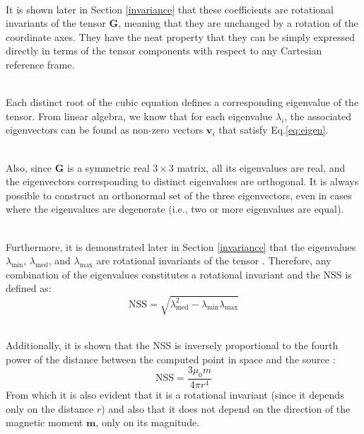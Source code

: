 \documentclass[main]{subfiles}
\begin{document}
\noindent\\
It is shown later in Section \ref{invariance} that these coefficients are rotational invariants of 
the tensor \( \mathbf{G} \), meaning that they are unchanged by a 
rotation of the coordinate axes. They have the neat property that they can be simply expressed
directly in terms of the tensor components with respect to any
Cartesian reference frame.

\noindent\\
Each distinct root of the cubic equation defines a corresponding 
eigenvalue of the tensor. From linear algebra, we know that for each eigenvalue \( \lambda_i \), the 
associated eigenvectors can be found as non-zero vectors 
\( \mathbf{v}_i \) that satisfy Eq.\ref{eq:eigen}.

\noindent\\
Also, since \( \mathbf{G} \) is a symmetric real \( 3 \times 3 \) matrix, 
all its eigenvalues are real, and the eigenvectors corresponding to 
distinct eigenvalues are orthogonal. It is always possible to construct 
an orthonormal set of the three eigenvectors, even in cases where the 
eigenvalues are degenerate (i.e., two or more eigenvalues are equal).

\noindent\\
Furthermore, it is demonstrated later in Section \ref{invariance} that the eigenvalues \( \lambda_{\text{min}} \), 
\( \lambda_{\text{med}} \), and \( \lambda_{\text{max}} \) are rotational 
invariants of the tensor \cite{NSS_single_different_dimensions}.
Therefore, any combination of the eigenvalues 
constitutes a rotational invariant and the NSS is defined as:
\begin{equation}
\text{NSS} = \sqrt{\lambda_{\text{med}}^2 - \lambda_{\text{min}} \lambda_{\text{max}}}
\label{eq:NSS}
\end{equation}

\noindent\\
Additionally, it is shown that the NSS is inversely proportional to the fourth power of 
the distance between the computed point in space and the source \cite{NSS_single_localization}:
\begin{equation}
\text{NSS} = \frac{3 \mu_0 m}{4 \pi r^4}
\label{eq:NSS_decay}
\end{equation}
From which it is also evident that it is a rotational invariant (since it depends
only on the distance $r$) and also that it does not depend on the direction of the magnetic
moment $\mathbf{m}$, only on its magnitude.
\end{document}

